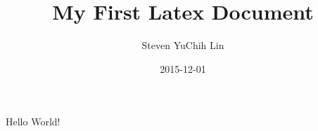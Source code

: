 \documentclass{article}
\title{My First Latex Document}
\date{2015-12-01}
\author{Steven YuChih Lin}
\begin{document}
  \maketitle
  \newpage

  Hello World!
\end{document}
